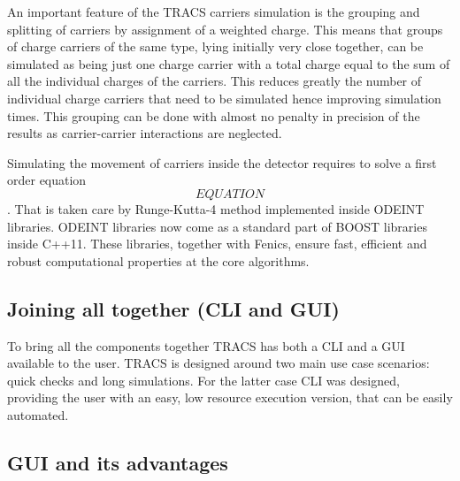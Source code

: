 An important feature of the TRACS carriers simulation is the grouping and splitting of carriers by assignment of a weighted charge. This means that groups of charge carriers  of the same type, lying initially very close together, can be simulated as being just one charge carrier with a total charge equal to the sum of all the individual charges of the carriers. This reduces greatly the number of individual charge carriers that need to be simulated hence improving simulation times. This grouping can be done with almost no penalty in precision of the results as carrier-carrier interactions are neglected.

Simulating the movement of carriers inside the detector requires to solve a first order equation\[EQUATION\]. That is taken care by Runge-Kutta-4 method implemented inside ODEINT libraries. ODEINT libraries now come as a standard part of BOOST libraries inside C++11. These libraries, together with Fenics, ensure fast, efficient and robust computational properties at the core algorithms.



\subsection{Joining all together (CLI and GUI)}

To bring all the components together TRACS has both a CLI and a GUI available to the user. TRACS is designed around two main use case scenarios: quick checks and long simulations. For the latter case CLI was designed, providing the user with an easy, low resource execution version, that can be easily automated. 

\subsection{GUI and its advantages}

